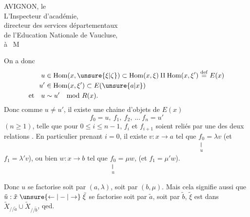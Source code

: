 AVIGNON, le\\[1ex]
L'Inspecteur d'académie,\\
directeur des services départementaux\\
de l'Education Nationale de Vaucluse,\\[1ex]
à \ M

On a donc
\[
\begin{aligned}
 u&\in\mathrm{Hom}(x,\unsure{\xi|\zeta})\subset\mathrm{Hom}(x,\xi)\amalg\mathrm{Hom}(x,\xi')\overset{\rm def}{=}E(x)\\
 u'&\in\mathrm{Hom}(x,\xi')\subset E(\unsure{a|x})\\
 \text{et}\quad u&\sim u'\quad\mathrm{mod}\ R(x).
\end{aligned}
\]
Donc  comme $u\ne u'$, il existe une chaine d'objets de $E(x)$
\[f_0=u,\ f_1,\ f_2,\ \ldots\ f_n=u'\]
$(n\geq1)$, telle que pour $0\leq i\leq n-1$, $f_i$ et $f_{i+1}$ soient reliés par une des deux relations . En particulier  prenant $i=0$, il existe $v:x\to a$ tel que $\underset{\substack{\Vert\\u}}{f_0}=\lambda v$ (et \deleted{\unsure{$\varnothing$}} $f_1=\lambda'v$), ou bien $w:x\to b$ tel que $\underset{\substack{\Vert\\u}}{f_0}=\mu w$, (et $f_1=\mu'w$).

Donc $u$ se factorise soit par $(a,\lambda)$, soit par $(b,\mu)$. Mais cela signifie aussi que $\tilde u:\tilde x\mathrel{\unsure{\leftarrow|-|\to}}\tilde\xi$ se factorise soit par $\tilde a$, soit par $\tilde b$,    $\tilde\xi$ est dans $\widetilde X_{//\tilde a}\cup\widetilde X_{//\tilde b}$,
qed.

